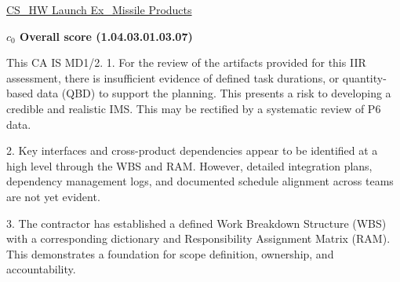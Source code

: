 % 


\begin{frame}{\href{run:../local/source-docs/1.04.03.01.03.07.pdf}{CS\_HW Launch Ex\_Missile Products}}
\centering
{}
\par
\vspace{0.75em}
\textbf{\small{\(c_0\) Overall score {\tiny (1.04.03.01.03.07)}}}\\\par
\vspace{0.5em}
\begin{minipage}{0.85\textwidth}
\raggedright
\fontsize{7}{9}\selectfont
This CA IS MD1/2. 1. For the review of the artifacts provided for this IIR assessment, there is insufficient evidence of defined task durations, or quantity-based data (QBD) to support the planning. This presents a risk to developing a credible and realistic IMS. This may be rectified by a systematic review of P6 data.\par\vspace{0.5em}2. Key interfaces and cross-product dependencies appear to be identified at a high level through the WBS and RAM. However, detailed integration plans, dependency management logs, and documented schedule alignment across teams are not yet evident.\par\vspace{0.5em}3. The contractor has established a defined Work Breakdown Structure (WBS) with a corresponding dictionary and Responsibility Assignment Matrix (RAM). This demonstrates a foundation for scope definition, ownership, and accountability.\par
\end{minipage}
\end{frame}
